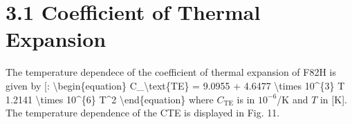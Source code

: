 \documentclass[letterpaper,10pt,english]{jupyterBook}
\begin{document}
	\section{3.1 Coefficient of Thermal Expansion}
	\label{\detokenize{3 Thermophysical Properties:coefficient-of-thermal-expansion}}
	\sphinxAtStartPar
	The temperature dependece of the coefficient of thermal expansion of F82H is given by {[}\sphinxhref{https://drive.google.com/file/d/1EAKnctMi6BqWtE4DrxCDe5L8niCH0WDe/view?usp=drive\_link}{TavassoliRensman2002}{]}:
	\textbackslash{}begin\{equation\}
	C\_\textbackslash{}text\{TE\} = 9.0955 + 4.6477 \textbackslash{}times 10\textasciicircum{}\{\sphinxhyphen{}3\} T \sphinxhyphen{} 1.2141 \textbackslash{}times 10\textasciicircum{}\{\sphinxhyphen{}6\} T\textasciicircum{}2
	\textbackslash{}end\{equation\}
	where \(C_\text{TE}\) is in \(10^{-6}\)/K and \(T\) in {[}K{]}. The temperature dependence of the CTE is displayed in Fig. 11.
	
\end{document}
